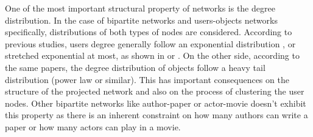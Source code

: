 One of the most important structural property of networks is the degree
distribution. In the case of bipartite networks and users-objects networks
specifically, distributions of both types of nodes are considered.
According to previous studies, users degree generally follow an exponential
distribution
\citep{latapy2008basic}, or stretched exponential \citep{laherrere1998stretched}
at most, as shown in \citet{shang10empirical} or \citet{grujic2009mixing}. On
the other side, according to the same papers, the degree distribution of objects
follow a heavy tail distribution (power law or similar). This has important
consequences on the structure of the projected network and also on the process
of clustering the user nodes. Other bipartite networks like author-paper or
actor-movie doesn't exhibit this property as there is an inherent constraint on
how many authors can write a paper or how many actors can play in a movie.


